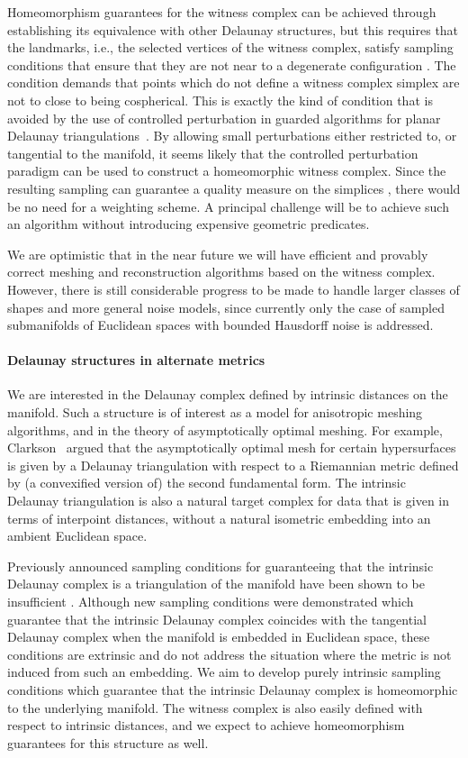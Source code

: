 Homeomorphism guarantees for the witness complex can be achieved
through establishing its equivalence with other Delaunay structures,
but this requires that the landmarks, i.e., the selected vertices of
the witness complex, satisfy sampling conditions that ensure that they
are not near to a degenerate configuration
\cite{boissonnat2011cgl,boissonnat2012stab}.  The condition demands
that points which do not define a witness complex simplex are not to
close to being cospherical. This is exactly the kind of condition that
is avoided by the use of controlled perturbation in guarded algorithms
for planar Delaunay triangulations~\cite{funke2005cp}. By allowing
small perturbations either restricted to, or tangential to the
manifold, it seems likely that the controlled perturbation paradigm can
be used to construct a homeomorphic witness complex. Since the
resulting sampling can guarantee a quality measure on the simplices
\cite{boissonnat2012stab}, there would be no need for a weighting
scheme.  A principal challenge will be to achieve such an algorithm
without introducing expensive geometric predicates.

We are optimistic that in the near future we will have efficient and
provably correct meshing and reconstruction algorithms based on the
witness complex.  However, there is still considerable progress to be
made to handle larger classes of shapes and more general noise models,
since currently only the case of sampled submanifolds of Euclidean
spaces with bounded Hausdorff noise is addressed.


\paragraph{Delaunay structures in alternate metrics}
We are interested in the Delaunay complex defined by intrinsic
distances on the manifold. Such a structure is of interest as a model
for anisotropic meshing algorithms, and in the theory of
asymptotically optimal meshing. For example,
Clarkson~\cite{clarkson2006} argued that the asymptotically optimal
mesh for certain hypersurfaces is given by a Delaunay triangulation
with respect to a Riemannian metric defined by (a convexified version
of) the second fundamental form. The intrinsic Delaunay triangulation
is also a natural target complex for data that is given in terms of
interpoint distances, without a natural isometric embedding into an
ambient Euclidean space.

Previously announced sampling conditions \cite{leibon2000} for
guaranteeing that the intrinsic Delaunay complex is a triangulation of
the manifold have been shown to be insufficient
\cite{boissonnat2012stab}. Although new sampling conditions were
demonstrated which guarantee that the intrinsic Delaunay complex
coincides with the tangential Delaunay complex when the manifold is
embedded in Euclidean space, these conditions are extrinsic and do not
address the situation where the metric is not induced from such an
embedding. We aim to develop purely intrinsic sampling conditions
which guarantee that the intrinsic Delaunay complex is homeomorphic to
the underlying manifold. The witness complex is also easily defined
with respect to intrinsic distances, and we expect to achieve
homeomorphism guarantees for this structure as well.


